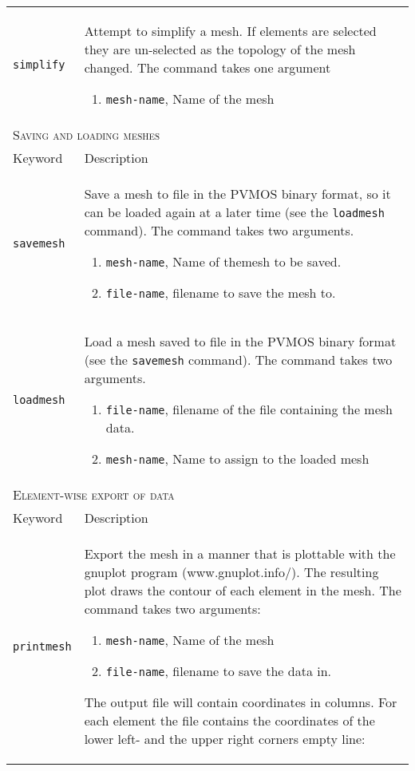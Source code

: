 \documentclass[noshowpacs,preprintnumbers,amsmath,amssymb, letter]{revtex4}
\begin{document}
\begin{longtable}{p{}p{}}
\texttt{simplify}	&  Attempt to simplify a mesh. If elements are selected they are un-selected as the topology of the mesh changed. The command takes one argument 
\begin{enumerate}
\item \texttt{mesh-name}, Name of the mesh
\end{enumerate}\\
\multicolumn{2}{l}{\textsc{Saving and loading meshes}} \\*
\hline
Keyword & Description \\
\texttt{savemesh}	& Save a mesh to file in the PVMOS binary format, so it can be loaded again at a later time (see the \texttt{loadmesh} command). The command takes two arguments.
\begin{enumerate}
\item \texttt{mesh-name}, Name of themesh to be saved.
\item \texttt{file-name}, filename to save the mesh to.
\end{enumerate}\\
\texttt{loadmesh}	& Load a mesh saved to file in the PVMOS binary format (see the \texttt{savemesh} command). The command takes two arguments.
\begin{enumerate}
\item \texttt{file-name}, filename of the file containing the mesh data.
\item \texttt{mesh-name}, Name to assign to the loaded mesh
\end{enumerate}\\
\multicolumn{2}{l}{\textsc{Element-wise export of data}} \\*
\hline
Keyword & Description \\
\texttt{printmesh}	& Export the mesh in a manner that is plottable with the gnuplot program (www.gnuplot.info/). The resulting plot draws the contour of each element in the mesh. The command takes two arguments:
\begin{enumerate}
\item \texttt{mesh-name}, Name of the mesh
\item \texttt{file-name}, filename to save the data in.
\end{enumerate}
The output file will contain coordinates in columns. For each element the file contains the coordinates of the lower left- and the upper right corners empty line:\newline 

\end{longtable}
\end{document}
